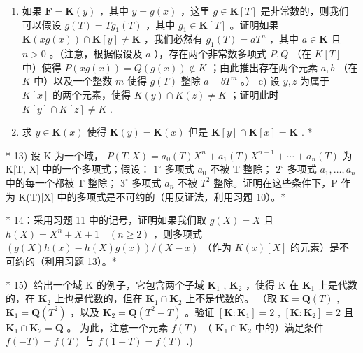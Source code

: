 \begin{enumerate}
\def\labelenumi{\alph{enumi})}
\setcounter{enumi}{1}
\item
  如果 \(\mathbf{F} = \mathbf{K}(y)\) ，其中 \(y = g(x)\) ，这里 \(g \in \mathbf{K}[T]\) 是非常数的，则我们可以假设 \(g(T) = Tg_1(T)\) ，其中 \(g_1 \in \mathbf{K}[T]\) 。证明如果 \(\mathbf{K}(xg(x)) \cap \mathbf{K}[y] \neq \mathbf{K}\) ，我们必然有 \(g_1(T) = aT^n\) ，其中 \(a \in \mathbf{K}\) 且 \(n > 0\) 。（注意，根据假设及 \(a\) ），存在两个非常数多项式 \(P, Q\) （在 \(K[T]\) 中）使得 \(P(xg(x)) = Q(g(x)) \notin K\) ；由此推出存在两个元素 \(a, b\) （在 \(K\) 中）以及一个整数 \(m\) 使得 \(g(T)\) 整除 \(a - bT^m\) 。） c) 设 \(y, z\) 为属于 \(K[x]\) 的两个元素，使得 \(K(y) \cap K(z) \neq K\) ；证明此时 \(K[y] \cap K[z] \neq K\) .
\item
  求 \(y \in \mathbf{K}(x)\) 使得 \(\mathbf{K}(y) = \mathbf{K}(x)\) 但是 \(\mathbf{K}[y] \cap \mathbf{K}[x] = \mathbf{K}\) . *
\end{enumerate}

* 13) 设 K 为一个域， \(P(T, X) = a_0(T)X^n + a_1(T)X^{n-1} + \cdots + a_n(T)\) 为 K{[}T, X{]} 中的一个多项式；假设： \(1^\circ\) 多项式 \(a_0\) 不被 T 整除； \(2^\circ\) 多项式 \(a_1, \ldots, a_n\) 中的每一个都被 T 整除； \(3^\circ\) 多项式 \(a_n\) 不被 \(T^2\) 整除。证明在这些条件下，P 作为 K(T){[}X{]} 中的多项式是不可约的（用反证法，利用习题 10）。*

* 14：采用习题 11 中的记号，证明如果我们取 \(g(X) = X\) 且 \(h(X) = X^n + X + 1 \quad (n \geqslant 2)\) ，则多项式 \((g(X)h(x) - h(X)g(x)) / (X - x)\) （作为 \(K(x)[X]\) 的元素）是不可约的（利用习题 13）。*

* 15）给出一个域 K 的例子，它包含两个子域 \(\mathbf{K}_1\) , \(\mathbf{K}_2\) ，使得 K 在 \(\mathbf{K}_1\) 上是代数的，在 \(\mathbf{K}_2\) 上也是代数的，但在 \(\mathbf{K}_1 \cap \mathbf{K}_2\) 上不是代数的。 （取 \(\mathbf{K} = \mathbf{Q}(T)\) , \(\mathbf{K}_1 = \mathbf{Q}(T^2)\) ，以及 \(\mathbf{K}_2 = \mathbf{Q}(T^2 - T)\) 。验证 \([\mathbf{K} : \mathbf{K}_1] = 2\) , \([\mathbf{K} : \mathbf{K}_2] = 2\) 且 \(\mathbf{K}_1 \cap \mathbf{K}_2 = \mathbf{Q}\) 。 为此，注意一个元素 \(f(T)\) （ \(\mathbf{K}_1 \cap \mathbf{K}_2\) 中的）满足条件 \(f(-T) = f(T)\) 与 \(f(1 - T) = f(T)\) .)

